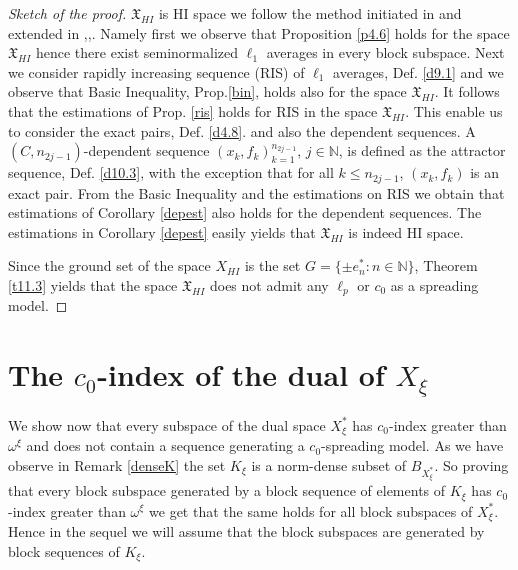 \documentclass[a4paper]{amsart}
\theoremstyle{plain}
\newcommand{\N}{\mathbb{N}}
\begin{document}
\begin{proof}[Sketch of the proof]
$\mathfrak{X}_{HI}$ is HI space we follow the method initiated in \cite{GM} and extended
in  \cite{AT},\cite{AAT},\cite{ATod}. Namely first we observe that  Proposition
\ref{p4.6} holds for the space $\mathfrak{X}_{HI}$ hence there exist seminormalized
$\ell_{1}$ averages in every block subspace. Next we consider  rapidly increasing sequence (RIS) of $\ell_{1}$
averages, Def. \ref{d9.1} and we observe that Basic Inequality, Prop.\ref{bin},  holds
also for the space $\mathfrak{X}_{HI}$. It follows that the  estimations of Prop.
\ref{ris} holds for  RIS in the space $\mathfrak{X}_{HI}$. This enable us to  consider
the exact pairs, Def. \ref{d4.8}.   and also the  dependent  sequences. A $(C,
n_{2j-1})$-dependent  sequence $(x_k,f_{k})_{k=1}^{n_{2j-1}}$, $j\in\N$,  is  defined as
the attractor sequence, Def. \ref{d10.3}, with the exception that for all $k\leq
n_{2j-1}$, $(x_{k},f_{k})$ is an exact pair.  From the Basic Inequality and the
estimations on RIS  we obtain that estimations  of  Corollary \ref{depest} also holds for
the dependent sequences.  The estimations  in Corollary \ref{depest} easily yields that
$\mathfrak{X}_{HI}$ is indeed  HI space.

Since the ground set of the space $X_{HI}$  is  the set $G=\{\pm e_{n}^{*}:n\in\N\}$,
Theorem \ref{t11.3} yields that the space
$\mathfrak{X}_{HI}$ does  not admit any   $\ell_{p}$ or $c_{0}$ as a spreading model.
\end{proof}
\section{The $c_0$-index of the dual of $X_\xi$}\label{sec12}
We show now that every subspace
of  the dual space $X_\xi^{*}$ has $c_0$-index greater than $\omega^{\xi}$ and
does not contain a sequence generating a $c_0$-spreading model. As we have observe in Remark \ref{denseK}  the set $K_{\xi}$ is a norm-dense subset of $B_{X_{\xi}^{*}}$. So proving that every block subspace generated by  a block sequence of elements of $K_{\xi}$ has  $c_0$-index greater than $\omega^{\xi}$ we get that the same holds for all block subspaces of $X_{\xi}^*$.  Hence in the sequel we will  assume that the block subspaces are generated by block sequences of $K_{\xi}$.
\end{document}
